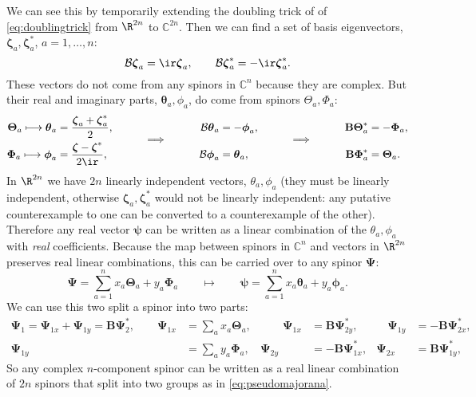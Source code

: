\documentclass[11pt]{article}
\newcommand{\B}{\mathbf{B}}
\newcommand{\Cb}{\mathbb{C}}
\newcommand{\psib}{\boldsymbol{\psi}}
\newcommand{\Psib}{\boldsymbol{\Psi}}
\newcommand{\thetab}{\boldsymbol{\theta}}
\newcommand{\Thetab}{\boldsymbol{\Theta}}
\newcommand{\phib}{\boldsymbol{\phi}}
\newcommand{\Phib}{\boldsymbol{\Phi}}
\newcommand{\zetab}{\boldsymbol{\zeta}}
\begin{document}
We can see this by temporarily extending the doubling trick of  of \cref{eq:doublingtrick} from \(\R^{2n}\) to \(\Cb^{2n}\).
Then we can find a set of basis eigenvectors, \(\zetab_a,\zetab^\ast_a\), \(a = 1,\ldots,n\):
%
\begin{equation*}
  \mathcal{B} \zetab_a = \ir \zetab_a,
  \qquad
  \mathcal{B} \zetab^\ast_a = -\ir \zetab^\ast_a.
\end{equation*}
%
These vectors do not come from any spinors in \(\Cb^n\) because they are complex.
But their real and imaginary parts, \(\thetab_a,\phi_a\), do come from spinors \(\Theta_a,\Phi_a\):
%
\begin{equation*}
\begin{aligned}
  \Thetab_a \longmapsto \thetab_a &= \frac{\zetab_a + \zetab^\ast_a}{2}, &
    &&
  \mathcal{B} \thetab_a &= - \phib_a, &
    &&
  \B \Thetab_a^\ast &= - \Phib_a, \\[-0.8em]
  &&
    \qquad &\smash{\implies} \qquad &
  &&
    \qquad &\smash{\implies} \qquad \\[-0.8em]
  \Phib_a \longmapsto \phib_a &= \frac{\zetab - \zetab^\ast}{2\ir}, &
    &&
  \mathcal{B} \phib_a &= \thetab_a, &
    &&
  \B \Phib_a^\ast &= \Thetab_a.
\end{aligned}
\end{equation*}
%
In \(\R^{2n}\) we have \(2n\) linearly independent vectors, \(\theta_a,\phi_a\)
(they must be linearly independent, otherwise \(\zetab_a,\zetab^\ast_a\) would not be linearly independent: any putative counterexample to one can be converted to a counterexample of the other).
Therefore any real vector \(\psib\) can be written as a linear combination of the \(\theta_a,\phi_a\) with \emph{real} coefficients.
Because the map between spinors in \(\Cb^n\) and vectors in \(\R^{2n}\) preserves real linear combinations, this can be carried over to any spinor \(\Psib\):
%
\begin{equation*}
  \Psib = \sum_{a=1}^n x_a \Thetab_a + y_a \Phib_a
  \qquad \longmapsto \qquad
  \psib = \sum_{a=1}^n x_a \thetab_a + y_a \phib_a.
\end{equation*}
%
We can use this two split a spinor into two parts:
%
\begin{equation*}
\begin{aligned}
  \Psib_1 = \Psib_{1x} + \Psib_{1y} = \B \Psib_2^\ast, 
  \qquad
  \Psib_{1x} &= \sum_a x_a \Thetab_a, 
  &\qquad
  \Psib_{1x} &=   \B \Psib_{2y}^\ast, &\quad
  \Psib_{1y} &= - \B \Psib_{2x}^\ast, 
  \\
  \Psib_{1y} &= \sum_a y_a \Phib_a, 
  &
  \Psib_{2y} &= - \B \Psib_{1x}^\ast, &
  \Psib_{2x} &=   \B \Psib_{1y}^\ast,
\end{aligned}
\end{equation*}
%
So any complex \(n\)-component spinor can be written as a real linear combination of \(2n\) spinors that split into two groups as in \cref{eq:pseudomajorana}.
\end{document}
